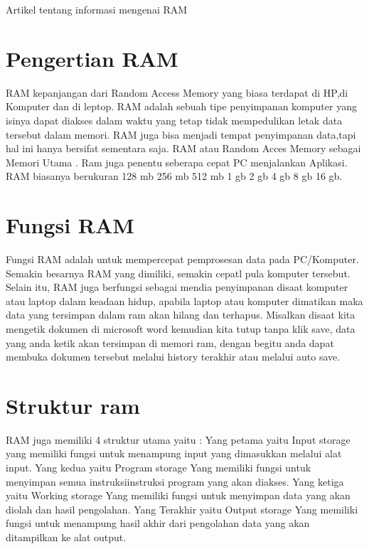 ﻿%





Artikel tentang informasi mengenai RAM

\section{Pengertian RAM}
RAM kepanjangan dari Random Access Memory yang biasa terdapat di HP,di Komputer dan di leptop.
RAM adalah sebuah tipe penyimpanan komputer yang isinya dapat diakses dalam waktu yang tetap tidak mempedulikan letak data tersebut dalam memori.
RAM juga bisa menjadi tempat penyimpanan data,tapi hal ini hanya bersifat sementara saja.
RAM atau Random Acces Memory sebagai Memori Utama . Ram juga penentu seberapa cepat PC menjalankan Aplikasi.
RAM biasanya berukuran 128 mb 256 mb 512 mb 1 gb 2 gb 4 gb 8 gb 16 gb.

\section{Fungsi RAM}
Fungsi RAM adalah untuk mempercepat pemprosesan data pada PC/Komputer. Semakin besarnya RAM yang dimiliki, semakin cepatl pula komputer tersebut.
Selain itu, RAM juga berfungsi sebagai mendia penyimpanan disaat komputer atau laptop dalam keadaan hidup, apabila laptop atau komputer dimatikan maka data yang tersimpan dalam ram akan hilang dan terhapus. Misalkan disaat kita mengetik dokumen di microsoft word kemudian kita tutup tanpa klik save, data yang anda ketik akan tersimpan di memori ram, dengan begitu anda dapat membuka dokumen tersebut melalui history terakhir atau melalui auto save.

\section{Struktur ram}
RAM juga memiliki 4 struktur utama yaitu :
Yang petama yaitu Input storage	yang memiliki fungsi untuk menampung input yang dimasukkan melalui alat input.
Yang kedua yaitu Program storage Yang memiliki fungsi untuk menyimpan semua instruksi\-instruksi program yang akan diakses.
Yang ketiga yaitu Working storage Yang memiliki fungsi untuk menyimpan data yang akan diolah dan hasil pengolahan.
Yang Terakhir yaitu Output storage Yang memiliki fungsi untuk menampung hasil akhir dari pengolahan data yang akan ditampilkan ke alat output.

